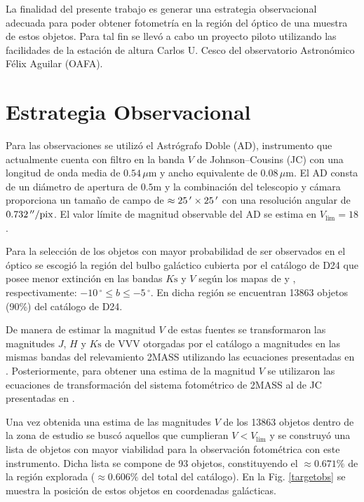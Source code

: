 \documentclass[baaa]{baaa}
\begin{document}
La finalidad del presente trabajo es generar una estrategia observacional adecuada para poder obtener fotometría en la región del óptico de una muestra de estos objetos. Para tal fin se llevó a cabo un proyecto piloto utilizando las facilidades de la estación de altura Carlos U. Cesco del observatorio Astronómico Félix Aguilar (OAFA). 

\section{Estrategia Observacional}

Para las observaciones se utilizó el Astrógrafo Doble (AD), instrumento que actualmente cuenta con filtro en la banda $V$ de Johnson--Cousins (JC) con una longitud de onda media de $0.54\,\mu \mathrm{m}$ y ancho equivalente de $0.08\,\mu\mathrm{m}$. El AD consta de un diámetro de apertura de $0.5\mathrm{m}$ y la combinación del telescopio y cámara proporciona un tamaño de campo de $\approx25\,\hbox{$^\prime$}\times25\,\hbox{$^\prime$}$ con una resolución angular de $0.732\,\hbox{$^{\prime\prime}$}\mathrm{/pix}$. El valor límite de magnitud observable del AD se estima en $V_{\mathrm{lim}}=18$.

Para la selección de los objetos con mayor probabilidad de ser observados en el óptico se escogió la región del bulbo galáctico cubierta por el catálogo de D24 que posee menor extinción en las bandas $K\mathrm{s}$ y $V$ según los mapas de \cite{chen2013} y \cite{schlafly2011}, respectivamente: $-10\,^\circ\leq b \leq -5\,^\circ$. En dicha región se encuentran 13863 objetos (90\%)  del catálogo de D24.

De manera de estimar la magnitud $V$ de estas fuentes se transformaron las magnitudes $J$, $H$ y $K\mathrm{s}$ de VVV otorgadas por el catálogo a magnitudes en las mismas bandas del relevamiento 2MASS utilizando las ecuaciones presentadas en \citet{Gon2018}.
Posteriormente, para obtener una estima de la magnitud $V$ se utilizaron las ecuaciones de transformación del sistema fotométrico de 2MASS al de JC presentadas en \cite{bilir2008}.

Una vez obtenida una estima de las magnitudes $V$ de los 13863 objetos dentro de la zona de estudio se buscó aquellos que cumplieran $V<V_{\mathrm{lim}}$ y se construyó una lista de objetos con mayor viabilidad para la observación fotométrica con este instrumento. Dicha lista se compone de 93 objetos, constituyendo el $\approx0.671\%$ de la región explorada ($\approx0.606\%$ del total del catálogo). En la Fig. \ref{targetobs} se muestra la posición de estos objetos en coordenadas galácticas.
\end{document}
